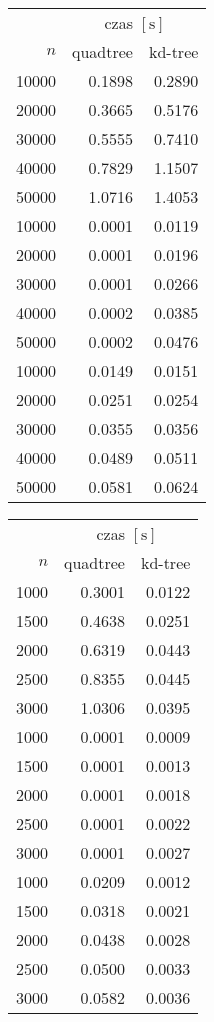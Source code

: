 \begin{tabular}{rrr}
    \toprule
    & \multicolumn{2}{c}{czas $[\mathrm{s}]$} \\
    $n$ & quadtree & kd-tree \\
    \midrule
    10000 & 0.1898 & 0.2890 \\
    20000 & 0.3665 & 0.5176 \\
    30000 & 0.5555 & 0.7410 \\
    40000 & 0.7829 & 1.1507 \\
    50000 & 1.0716 & 1.4053 \\
    \midrule
    10000 & 0.0001 & 0.0119 \\
    20000 & 0.0001 & 0.0196 \\
    30000 & 0.0001 & 0.0266 \\
    40000 & 0.0002 & 0.0385 \\
    50000 & 0.0002 & 0.0476 \\
    \midrule
    10000 & 0.0149 & 0.0151 \\
    20000 & 0.0251 & 0.0254 \\
    30000 & 0.0355 & 0.0356 \\
    40000 & 0.0489 & 0.0511 \\
    50000 & 0.0581 & 0.0624 \\
    \bottomrule
\end{tabular}

\begin{tabular}{rrr}
    \toprule
    & \multicolumn{2}{c}{czas $[\mathrm{s}]$} \\
    $n$ & quadtree & kd-tree \\
    \midrule
    1000 & 0.3001 & 0.0122 \\
    1500 & 0.4638 & 0.0251 \\
    2000 & 0.6319 & 0.0443 \\
    2500 & 0.8355 & 0.0445 \\
    3000 & 1.0306 & 0.0395 \\
    \midrule
    1000 & 0.0001 & 0.0009 \\
    1500 & 0.0001 & 0.0013 \\
    2000 & 0.0001 & 0.0018 \\
    2500 & 0.0001 & 0.0022 \\
    3000 & 0.0001 & 0.0027 \\
    \midrule
    1000 & 0.0209 & 0.0012 \\
    1500 & 0.0318 & 0.0021 \\
    2000 & 0.0438 & 0.0028 \\
    2500 & 0.0500 & 0.0033 \\
    3000 & 0.0582 & 0.0036 \\
    \bottomrule
\end{tabular}